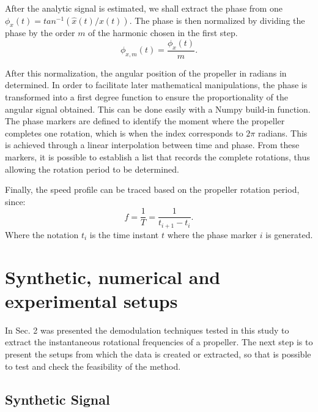 \documentclass[10pt,fleqn,a4paper,twoside]{article}
\begin{document}
After the analytic signal is estimated, we shall extract the phase from one $\phi_{x} (t) = tan^{-1}(\hat{x}(t)/x(t))$. The phase is then normalized by dividing the phase by the order $m$ of the harmonic chosen in the first step. 
\begin{equation}
    \phi_{x,m} (t)=\frac{\phi_{x}(t)}{m}. 
    \label{eq3}
\end{equation}

After this normalization, the angular position of the propeller in radians in determined. In order to facilitate later mathematical manipulations, the phase is transformed into a first degree function to ensure the proportionality of the angular signal obtained. This can be done easily with a Numpy build-in function. The phase markers are defined to identify the moment where the propeller completes one rotation, which is when the index corresponds to $2\pi$ radians. This is achieved through a linear interpolation between time and phase. From these markers, it is possible to establish a list that records the complete rotations, thus allowing the rotation period to be determined.

Finally, the speed profile can be traced based on the propeller rotation period, since:
\begin{equation}
    f = \frac{1}{T} = \frac{1}{t_{i+1}-t_{i}}.
    \label{eq4}
\end{equation}
Where the notation $t_{i}$ is the time instant $t$ where the phase marker $i$ is generated. 

\section{Synthetic, numerical and experimental setups}
In Sec. 2 was presented the demodulation techniques tested in this study to extract the instantaneous rotational frequencies of a propeller. The next step is to present the setups from which the data is created or extracted, so that is possible to test and check the feasibility of the method.

\subsection{Synthetic Signal}
\end{document}
